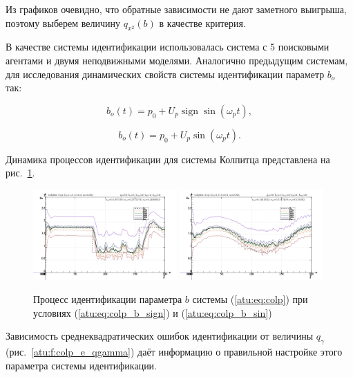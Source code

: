 \documentclass[a4paper,12pt]{article}
\DeclareMathOperator*{\sign}{sign}
\begin{document}
Из графиков очевидно, что
обратные зависимости не дают заметного выигрыша, поэтому выберем
величину $ q_{x^2}(b) $ в качестве критерия.

В качестве системы идентификации использовалась система с 5 поисковыми агентами и
двумя неподвижными моделями. Аналогично предыдущим системам,
для исследования динамических свойств системы идентификации
параметр $b_o$ так:

\begin{equation}
 b_o(t) = p_0 + U_p \sign \sin( \omega_p t ),
  \label{atu:eq:colp_b_sign}
\end{equation}

\begin{equation}
 b_o(t) = p_0 + U_p \sin( \omega_p t ).
  \label{atu:eq:colp_b_sin}
\end{equation}

Динамика процессов идентификации для системы Колпитца представлена на рис.~\ref{atu:f:colp_id}.

\begin{figure}[htb!]
\centerline{
  \includegraphics[width=0.49\textwidth]{p/cha/colp/colp_m5p-pl_n_sign.png}
  \includegraphics[width=0.49\textwidth]{p/cha/colp/colp_m5p-pl_n_sin.png}
}
\caption{Процесс идентификации параметра $b$ системы (\ref{atu:eq:colp})
  при условиях (\ref{atu:eq:colp_b_sign}) и (\ref{atu:eq:colp_b_sin})
}
\label{atu:f:colp_id}
\end{figure}

Зависимость среднеквадратических ошибок идентификации от величины $q_\gamma$ (рис.~\ref{atu:f:colp_e_qgamma})
даёт информацию о правильной настройке этого параметра системы идентификации.
\end{document}
